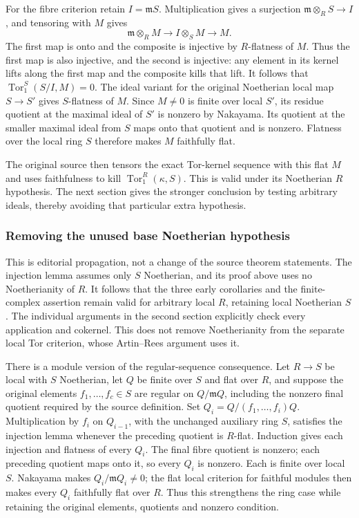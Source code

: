 For the fibre criterion retain \(I=\mathfrak mS\). Multiplication gives a surjection \(\mathfrak m\otimes_RS\to I\), and tensoring with \(M\) gives \[
\mathfrak m\otimes_RM\longrightarrow I\otimes_SM\longrightarrow M.
\] The first map is onto and the composite is injective by \(R\)-flatness of \(M\). Thus the first map is also injective, and the second is injective: any element in its kernel lifts along the first map and the composite kills that lift. It follows that \(\operatorname{Tor}_1^S(S/I,M)=0\). The ideal variant for the original Noetherian local map \(S\to S'\) gives \(S\)-flatness of \(M\). Since \(M\ne0\) is finite over local \(S'\), its residue quotient at the maximal ideal of \(S'\) is nonzero by Nakayama. Its quotient at the smaller maximal ideal from \(S\) maps onto that quotient and is nonzero. Flatness over the local ring \(S\) therefore makes \(M\) faithfully flat.

The original source then tensors the exact Tor-kernel sequence with this flat \(M\) and uses faithfulness to kill \(\operatorname{Tor}_1^R(\kappa,S)\). This is valid under its Noetherian \(R\) hypothesis. The next section gives the stronger conclusion by testing arbitrary ideals, thereby avoiding that particular extra hypothesis.

\subsubsection{Removing the unused base Noetherian hypothesis}\label{removing-the-unused-base-noetherian-hypothesis}

This is editorial propagation, not a change of the source theorem statements. The injection lemma assumes only \(S\) Noetherian, and its proof above uses no Noetherianity of \(R\). It follows that the three early corollaries and the finite-complex assertion remain valid for arbitrary local \(R\), retaining local Noetherian \(S\). The individual arguments in the second section explicitly check every application and cokernel. This does not remove Noetherianity from the separate local Tor criterion, whose Artin--Rees argument uses it.

There is a module version of the regular-sequence consequence. Let \(R\to S\) be local with \(S\) Noetherian, let \(Q\) be finite over \(S\) and flat over \(R\), and suppose the original elements \(f_1,\ldots,f_c\in S\) are regular on \(Q/\mathfrak mQ\), including the nonzero final quotient required by the source definition. Set \(Q_i=Q/(f_1,\ldots,f_i)Q\). Multiplication by \(f_i\) on \(Q_{i-1}\), with the unchanged auxiliary ring \(S\), satisfies the injection lemma whenever the preceding quotient is \(R\)-flat. Induction gives each injection and flatness of every \(Q_i\). The final fibre quotient is nonzero; each preceding quotient maps onto it, so every \(Q_i\) is nonzero. Each is finite over local \(S\). Nakayama makes \(Q_i/\mathfrak mQ_i\ne0\); the flat local criterion for faithful modules then makes every \(Q_i\) faithfully flat over \(R\). Thus this strengthens the ring case while retaining the original elements, quotients and nonzero condition.

